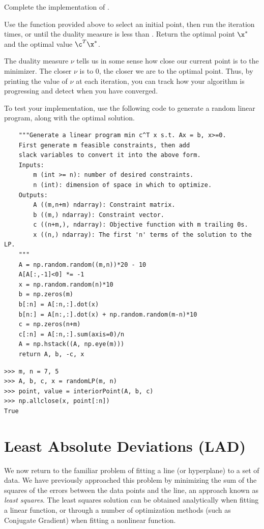 \begin{problem} %
Complete the implementation of .

Use the function  provided above to select an initial point, then run the iteration  times, or until the duality measure is less than .
Return the optimal point $\x^*$ and the optimal value $\c^T\x^*$.

The duality measure $\nu$ tells us in some sense how close our current point is to the minimizer.
The closer $\nu$ is to 0, the closer we are to the optimal point.
Thus, by printing the value of $\nu$ at each iteration, you can track how your algorithm is progressing and detect when you have converged.

To test your implementation, use the following code to generate a random linear program, along with the optimal solution.
\begin{lstlisting}
    """Generate a linear program min c^T x s.t. Ax = b, x>=0.
    First generate m feasible constraints, then add
    slack variables to convert it into the above form.
    Inputs:
        m (int >= n): number of desired constraints.
        n (int): dimension of space in which to optimize.
    Outputs:
        A ((m,n+m) ndarray): Constraint matrix.
        b ((m,) ndarray): Constraint vector.
        c ((n+m,), ndarray): Objective function with m trailing 0s.
        x ((n,) ndarray): The first 'n' terms of the solution to the LP.
    """
    A = np.random.random((m,n))*20 - 10
    A[A[:,-1]<0] *= -1
    x = np.random.random(n)*10
    b = np.zeros(m)
    b[:n] = A[:n,:].dot(x)
    b[n:] = A[n:,:].dot(x) + np.random.random(m-n)*10
    c = np.zeros(n+m)
    c[:n] = A[:n,:].sum(axis=0)/n
    A = np.hstack((A, np.eye(m)))
    return A, b, -c, x
\end{lstlisting}
\begin{lstlisting}
>>> m, n = 7, 5
>>> A, b, c, x = randomLP(m, n)
>>> point, value = interiorPoint(A, b, c)
>>> np.allclose(x, point[:n])
True
\end{lstlisting}
\end{problem}


\section*{Least Absolute Deviations (LAD)} %
We now return to the familiar problem of fitting a line (or hyperplane) to a set of data.
We have previously approached this problem by minimizing the sum of the squares of the errors between the data points and the line, an approach known as \emph{least squares}.
The least squares solution can be obtained analytically when fitting a linear function, or through a number of optimization methods (such as Conjugate Gradient) when fitting a nonlinear function.

